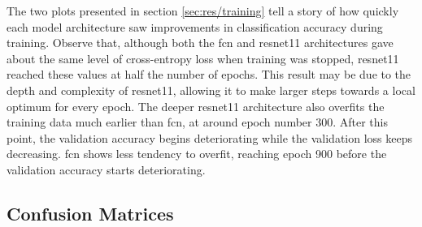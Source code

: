 The two plots presented in section \ref{sec:res/training} tell a story of how quickly each model architecture saw improvements in classification accuracy during training. Observe that, although both the \acrshort{fcn} and \acrshort{resnet11} architectures gave about the same level of cross-entropy loss when training was stopped, \acrshort{resnet11} reached these values at half the number of epochs. This result may be due to the depth and complexity of \acrshort{resnet11}, allowing it to make larger steps towards a local optimum for every epoch. The deeper \acrshort{resnet11} architecture also overfits the training data much earlier than \acrshort{fcn}, at around epoch number 300. After this point, the validation accuracy begins deteriorating while the validation loss keeps decreasing. \acrshort{fcn} shows less tendency to overfit, reaching epoch 900 before the validation accuracy starts deteriorating.



\subsection{Confusion Matrices} \label{sec:disc/classification/cm}



